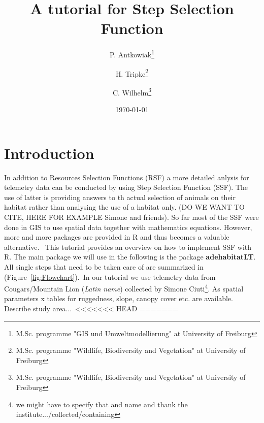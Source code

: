 \documentclass[11pt, a4paper]{article}\usepackage[]{graphicx}\usepackage[]{color}
\begin{document}



\title{A tutorial for Step Selection Function}

\author{P. Antkowiak\thanks{M.Sc. programme "GIS und Umweltmodellierung" at University of Freiburg} \and H. Tripke\thanks{M.Sc. programme "Wildlife, Biodiversity and Vegetation" at University of Freiburg} \and C. Wilhelm\thanks{M.Sc. programme "Wildlife, Biodiversity and Vegetation" at University of Freiburg}}

\date{\today} %

\maketitle


\tableofcontents

\newpage

\section{Introduction}%
In addition to Resources Selection Functions (RSF) a more detailed anlysis for telemetry data can be conducted by using Step Selection Function (SSF). The use of latter is providing answers to th actual selection of animals on their habitat rather than analysing the use of a habitat only. (DO WE WANT TO CITE, HERE FOR EXAMPLE Simone and friends). So far most of the SSF were done in GIS to use spatial data together with mathematics equations. However, more and more packages are provided in R and thus becomes a valuable alternative. \
This tutorial provides an overview on how to implement SSF with R. The main package we will use in the following is the package \textbf{adehabitatLT}. All single steps that need to be taken care of are summarized in (Figure~\ref{fig:Flowchart}).\
In our tutorial we use telemetry data from Cougars/Mountain Lion (\textit{Latin name}) collected by Simone Ciuti\footnote{we might have to specify that and name and thank the institute.../collected/containing}. As spatial parameters x tables for ruggedness, slope, canopy cover etc. are available. Describe study area...\
<<<<<<< HEAD
=======
\end{document}
